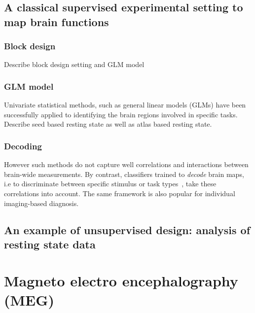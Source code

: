 \subsection{A classical supervised experimental setting to map brain functions}
\subsubsection{Block design}
Describe block design setting and GLM model
\subsubsection{GLM model}
Univariate statistical methods, such as general linear models (GLMs)
\cite{friston1995analysis} have been successfully applied to
identifying the brain regions involved in specific tasks.
% 
Describe seed based resting state as well as atlas based resting state.

\subsubsection{Decoding}
However such methods do not capture well correlations and interactions between brain-wide measurements.
By contrast, classifiers trained 
to \emph{decode} brain maps, i.e to discriminate between specific stimulus or task types~\cite{shirer_decoding_2012,varoquaux_how_2014,loula_decoding_2018}, take these correlations into account. 
% 
The same framework is also popular for individual imaging-based diagnosis.

% 
\subsection{An example of unsupervised design: analysis of resting state data}

\section{Magneto electro encephalography (MEG)}
